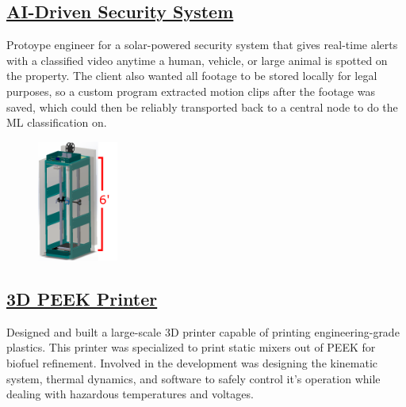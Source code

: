 \documentclass[
	10pt, %
]{FreemanCV}
\begin{document}
\begin{paracol}{2}
\vspace*{-10pt}
\leavevmode \subsection{\href{https://github.com/jfcbooth/security_system}{AI-Driven Security System \scriptsize\faLink}}

Protoype engineer for a solar-powered security system that gives real-time alerts with a classified video anytime a human, vehicle, or large animal is spotted
on the property. The client also wanted all footage to be stored locally for legal purposes, so a custom program extracted motion clips
after the footage was saved, which could then be reliably transported back to a central node to do the ML classification on.


\setlength\intextsep{7pt} %
\begin{figure} %
	\hspace*{-23pt} %
    \includegraphics[width=75pt]{printer} %
\end{figure}

\vspace*{-10pt} %
\leavevmode\subsection{\href{https://github.com/jfcbooth/3dpp}{3D PEEK Printer \scriptsize\faLink}}

Designed and built a large-scale 3D printer capable of printing engineering-grade plastics.
This printer was specialized to print static mixers out of PEEK for biofuel refinement.
Involved in the development was designing the kinematic system, thermal dynamics, and software to safely control it's operation
while dealing with hazardous temperatures and voltages.


\end{paracol}
\end{document}
